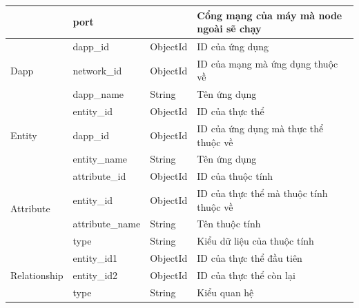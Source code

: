 \documentclass[../DoAn.tex]{subfiles}
\begin{document}
\begin{longtable}{|p{}|p{}|p{}|p{}|}
                                                   & port               &              & Cổng mạng của máy mà node ngoài sẽ chạy  \\ \hline
    \multirow[t]{3}{0.175\textwidth}{Dapp}         & dapp\_id           & ObjectId     & ID của ứng dụng                          \\ \cline{2-4}
                                                   & network\_id        & ObjectId     & ID của mạng mà ứng dụng thuộc về         \\ \cline{2-4}
                                                   & dapp\_name         & String       & Tên ứng dụng                             \\ \hline
    \multirow[t]{3}{0.175\textwidth}{Entity}       & entity\_id         & ObjectId     & ID của thực thể                          \\ \cline{2-4}
                                                   & dapp\_id           & ObjectId     & ID của ứng dụng mà thực thể thuộc về     \\ \cline{2-4}
                                                   & entity\_name       & String       & Tên ứng dụng                             \\ \hline
    \multirow[t]{4}{0.175\textwidth}{Attribute}    & attribute\_id      & ObjectId     & ID của thuộc tính                        \\ \cline{2-4}
                                                   & entity\_id         & ObjectId     & ID của thực thể mà thuộc tính thuộc về   \\ \cline{2-4}
                                                   & attribute\_name    & String       & Tên thuộc tính                           \\ \cline{2-4}
                                                   & type               & String       & Kiểu dữ liệu của thuộc tính              \\ \hline
    \multirow[t]{3}{0.175\textwidth}{Relationship} & entity\_id1        & ObjectId     & ID của thực thể đầu tiên                 \\ \cline{2-4}
                                                   & entity\_id2        & ObjectId     & ID của thực thể còn lại                  \\ \cline{2-4}
                                                   & type               & String       & Kiểu quan hệ                             \\ \hline
\end{longtable}
\end{document}
